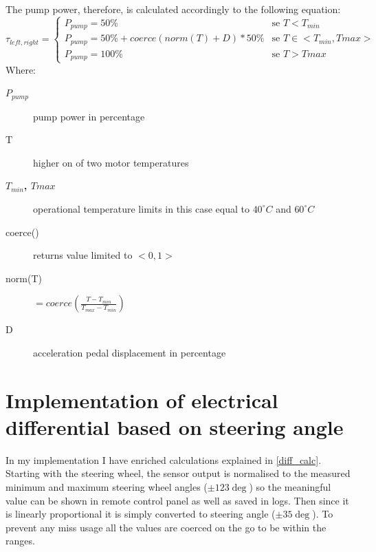 The pump power, therefore, is calculated accordingly to the following equation:
\begin{equation}\label{pump_eq}
    \tau_{left,right} = \begin{cases}
        P_{pump} = 50\% & \text{se $T<T_{min}$}\\
        P_{pump} = 50\%+coerce(norm(T) + D)*50\% & \text{se $T \in <T_{min},T{max}>$}\\
        P_{pump} = 100\% & \text{se $T>T{max}$}
    \end{cases}
\end{equation}
Where:
\begin{description}
    \item[$P_{pump}$] pump power in percentage
    \item[T] higher on of two motor temperatures
    \item[\textbf{$T_{min}$, $T{max}$}] operational temperature limits in this case equal to $40^\circ C$ and $60^\circ C$
    \item[coerce()] returns value limited to $<0,1>$
    \item[norm(T)] $=coerce(\frac{T - T_{min}}{T_{max}-T_{min}})$ 
    \item[D] acceleration pedal displacement in percentage
\end{description}

\section{Implementation of electrical differential based on steering angle}\label{diff_meth}
In my implementation I have enriched calculations explained in \ref{diff_calc}. Starting with the steering wheel, the sensor output is normalised to the measured minimum and maximum steering wheel angles ($\pm123\deg$) so the meaningful value can be shown in remote control panel as well as saved in logs. 
Then since it is linearly proportional it is simply converted to steering angle ($\pm35\deg$). To prevent any miss usage all the values are coerced on the go to be within the ranges.

